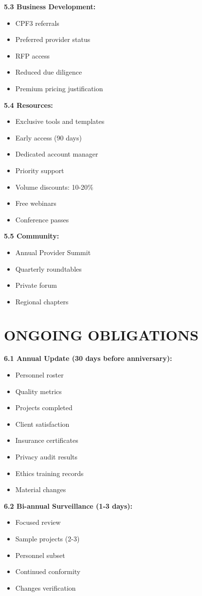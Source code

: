 \documentclass[11pt,a4paper]{article}
\begin{document}
\textbf{5.3 Business Development:}
\begin{itemize}
\item CPF3 referrals
\item Preferred provider status
\item RFP access
\item Reduced due diligence
\item Premium pricing justification
\end{itemize}

\textbf{5.4 Resources:}
\begin{itemize}
\item Exclusive tools and templates
\item Early access (90 days)
\item Dedicated account manager
\item Priority support
\item Volume discounts: 10-20\%
\item Free webinars
\item Conference passes
\end{itemize}

\textbf{5.5 Community:}
\begin{itemize}
\item Annual Provider Summit
\item Quarterly roundtables
\item Private forum
\item Regional chapters
\end{itemize}

\section{ONGOING OBLIGATIONS}

\textbf{6.1 Annual Update (30 days before anniversary):}
\begin{itemize}
\item Personnel roster
\item Quality metrics
\item Projects completed
\item Client satisfaction
\item Insurance certificates
\item Privacy audit results
\item Ethics training records
\item Material changes
\end{itemize}

\textbf{6.2 Bi-annual Surveillance (1-3 days):}
\begin{itemize}
\item Focused review
\item Sample projects (2-3)
\item Personnel subset
\item Continued conformity
\item Changes verification
\end{itemize}
\end{document}
